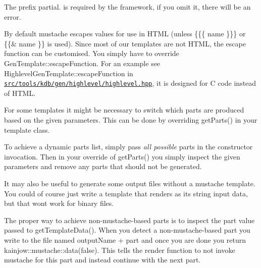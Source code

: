The prefix {\ttfamily partial.} is required by the framework, if you omit it, there will be an error.

By default mustache escapes values for use in H\+T\+ML (unless {\ttfamily \{\{\{ name \}\}\}} or {\ttfamily \{\{\& name \}\}} is used). Since most of our templates are not H\+T\+ML, the escape function can be customised. You simply have to override {\ttfamily Gen\+Template\+::escape\+Function}. For an example see {\ttfamily Highlevel\+Gen\+Template\+::escape\+Function} in \href{/home/mpranj/workspace/libelektra/src/tools/kdb/gen/highlevel/highlevel.hpp}{\texttt{ {\ttfamily src/tools/kdb/gen/highlevel/highlevel.\+hpp}}}, it is designed for C code instead of H\+T\+ML.

For some templates it might be necessary to switch which parts are produced based on the given parameters. This can be done by overriding {\ttfamily get\+Parts()} in your template class.

To achieve a dynamic parts list, simply pass {\itshape all possible} parts in the constructor invocation. Then in your override of {\ttfamily get\+Parts()} you simply inspect the given parameters and remove any parts that should not be generated.

It may also be useful to generate some output files without a mustache template. You could of course just write a template that renders as its string input data, but that won\textquotesingle{}t work for binary files.

The proper way to achieve non-\/mustache-\/based parts is to inspect the {\ttfamily part} value passed to {\ttfamily get\+Template\+Data()}. When you detect a non-\/mustache-\/based part you write to the file named {\ttfamily output\+Name + part} and once you are done you return {\ttfamily kainjow\+::mustache\+::data(false)}. This tells the render function to not invoke mustache for this part and instead continue with the next part. 